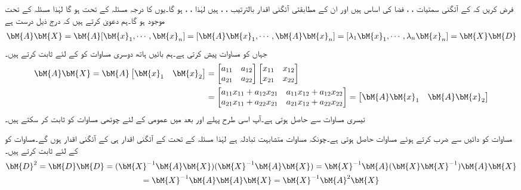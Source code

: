 
فرض کریں کہ  کے آئگنی سمتیات ،  ، فضا  کی اساس ہیں اور ان کے مطابقتی آئگنی اقدار بالترتیب ، ، ہیں لہٰذا ، ، ہو گا۔یوں  کا درجہ مسئلہ  کے تحت  ہو گا لہٰذا مسئلہ  کے تحت   موجود ہو گا۔ہم دعویٰ کرتے ہیں کہ درج ذیل درست ہے
\begin{align}\label{مساوات_آئگنی_وتری_حصول_پ}
\bM{A}\bM{X}=\bM{A}[\bM{x}_1,\cdots,\bM{x}_n]=[\bM{A}\bM{x}_1,\cdots,\bM{A}\bM{x}_n]=[\lambda_1\bM{x}_1,\cdots,\lambda_n\bM{x}_n]=\bM{X}\bM{D}
\end{align}
جہاں  کو مساوات  پیش کرتی ہے۔ہم بائیں ہاتھ دوسری مساوات کو  کے لئے ثابت کرتے ہیں۔
\begin{align*}
\bM{A}\bM{X}=\bM{A}\begin{bmatrix}\bM{x}_1\quad \bM{x}_2\end{bmatrix}&=\begin{bmatrix}a_{11}\quad a_{12}\\a_{21}\quad a_{22}  \end{bmatrix}\begin{bmatrix}x_{11}\quad x_{12}\\x_{21}\quad x_{22}  \end{bmatrix}\\
&=\begin{bmatrix} a_{11}x_{11}+a_{12}x_{21}\quad a_{11}x_{12}+a_{12}x_{22} \\ a_{21}x_{11}+a_{22}x_{21}\quad a_{21}x_{12}+a_{22}x_{22}\end{bmatrix}=\begin{bmatrix} \bM{A}\bM{x}_1\quad \bM{A}\bM{x}_2 \end{bmatrix}
\end{align*}
تیسری مساوات  سے حاصل ہوتی ہے۔آپ اسی طرح پہلے  اور بعد میں عمومی  کے لئے چوتھی مساوات کو ثابت کر سکتے ہیں۔

مساوات  کو دائیں  سے ضرب کرتے ہوئے مساوات  حاصل ہوتی ہے۔چونکہ مساوات  متشابہت تبادلہ ہے  لہٰذا مسئلہ  کے تحت  کے آئگنی اقدار ہی  کے آئگنی اقدار  ہوں گے۔مساوات  کو  کے لئے ثابت کرتے ہیں۔
\begin{multline*}
\bM{D}^2=\bM{D}\bM{D}=(\bM{X}^{-1}\bM{A}\bM{X})(\bM{X}^{-1}\bM{A}\bM{X})=\bM{X}^{-1}\bM{A}(\bM{X}\bM{X}^{-1})\bM{A}\bM{X}\\
=\bM{X}^{-1}\bM{A}\bM{A}\bM{X}=\bM{X}^{-1}\bM{A}^2\bM{X}
\end{multline*}

